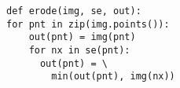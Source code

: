 \documentclass[varwidth=4cm, border={0.1cm 0.1cm 0.1cm 0.1cm}]{standalone}
\begin{document}
\begin{verbatim}
def erode(img, se, out):
for pnt in zip(img.points()):
    out(pnt) = img(pnt)
    for nx in se(pnt):
      out(pnt) = \
        min(out(pnt), img(nx))
\end{verbatim}
\end{document}
